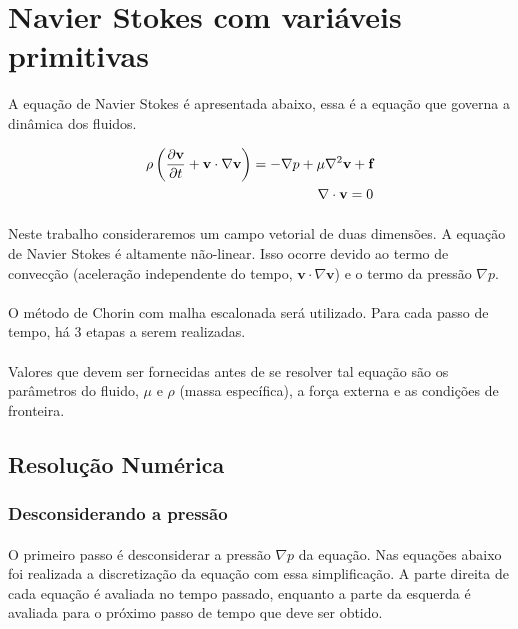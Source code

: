 \documentclass[poisson.tex]{subfiles}
\begin{document}
\section{Navier Stokes com variáveis primitivas}
A equação de Navier Stokes é apresentada abaixo, essa é a equação que governa a dinâmica dos fluidos.

\begin{eqnarray}
\NavierStokesEq{\textbf{v}}{\textbf{f}}{navierstokes}\\
\NScondition{\textbf{v}}
\end{eqnarray}

\paragraph{} Neste trabalho consideraremos um campo vetorial de duas dimensões. A equação de Navier Stokes é altamente não-linear. Isso ocorre devido ao termo de convecção (aceleração independente do tempo, $\textbf{v}\cdot \nabla\textbf{v}$) e o termo da pressão $\nabla p$. 

\paragraph{} O método de Chorin com malha escalonada será utilizado. Para cada passo de tempo, há 3 etapas a serem realizadas. 
\paragraph{} Valores que devem ser fornecidas antes de se resolver tal equação são os parâmetros do fluido, $\mu$ e $\rho$ (massa específica), a força externa e as condições de fronteira. 
\subsection{Resolução Numérica}
\subsubsection{Desconsiderando a pressão}
\paragraph{} O primeiro passo é desconsiderar a pressão $\nabla p$ da equação. Nas equações abaixo foi realizada a discretização da equação com essa simplificação. A parte direita de cada equação é avaliada no tempo passado, enquanto a parte da esquerda é avaliada para o próximo passo de tempo que deve ser obtido.
\end{document}
